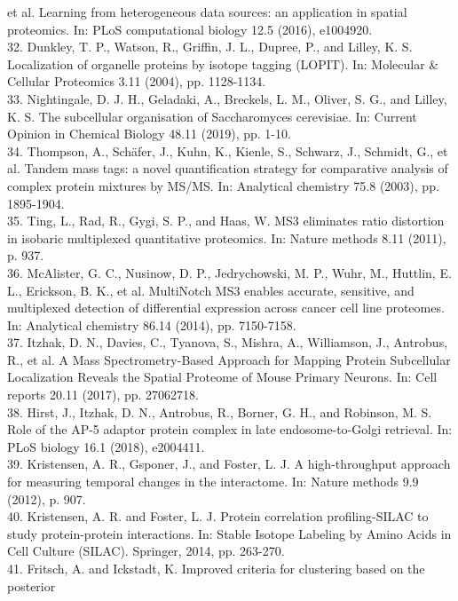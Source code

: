 \documentclass[12pt,english]{article}
\begin{document}
et al. Learning from heterogeneous data sources: an application in spatial proteomics.
In: PLoS computational biology 12.5 (2016), e1004920.
\\
32. Dunkley, T. P., Watson, R., Griffin, J. L., Dupree, P., and Lilley, K. S. Localization of
organelle proteins by isotope tagging (LOPIT). In: Molecular \& Cellular Proteomics
3.11 (2004), pp. 1128-1134.
\\
33. Nightingale, D. J. H., Geladaki, A., Breckels, L. M., Oliver, S. G., and Lilley, K. S. The
subcellular organisation of Saccharomyces cerevisiae. In: Current Opinion in Chemical
Biology 48.11 (2019), pp. 1-10.
\\
34. Thompson, A., Schäfer, J., Kuhn, K., Kienle, S., Schwarz, J., Schmidt, G., et al. Tandem
mass tags: a novel quantification strategy for comparative analysis of complex
protein mixtures by MS/MS. In: Analytical chemistry 75.8 (2003), pp. 1895-1904.
\\
35. Ting, L., Rad, R., Gygi, S. P., and Haas, W. MS3 eliminates ratio distortion in isobaric
multiplexed quantitative proteomics. In: Nature methods 8.11 (2011), p. 937.
\\
36. McAlister, G. C., Nusinow, D. P., Jedrychowski, M. P., Wuhr, M., Huttlin, E. L.,
Erickson, B. K., et al. MultiNotch MS3 enables accurate, sensitive, and multiplexed
detection of differential expression across cancer cell line proteomes. In: Analytical
chemistry 86.14 (2014), pp. 7150-7158.
\\
37. Itzhak, D. N., Davies, C., Tyanova, S., Mishra, A., Williamson, J., Antrobus, R., et al.
A Mass Spectrometry-Based Approach for Mapping Protein Subcellular Localization
Reveals the Spatial Proteome of Mouse Primary Neurons. In: Cell reports 20.11 (2017),
pp. 27062718.
\\
38. Hirst, J., Itzhak, D. N., Antrobus, R., Borner, G. H., and Robinson, M. S. Role of the
AP-5 adaptor protein complex in late endosome-to-Golgi retrieval. In: PLoS biology
16.1 (2018), e2004411.
\\
39. Kristensen, A. R., Gsponer, J., and Foster, L. J. A high-throughput approach for
measuring temporal changes in the interactome. In: Nature methods 9.9 (2012), p. 907.
\\
40. Kristensen, A. R. and Foster, L. J. Protein correlation profiling-SILAC to study
protein-protein interactions. In: Stable Isotope Labeling by Amino Acids in Cell Culture
(SILAC). Springer, 2014, pp. 263-270.
\\
41. Fritsch, A. and Ickstadt, K. Improved criteria for clustering based on the posterior
\end{document}
